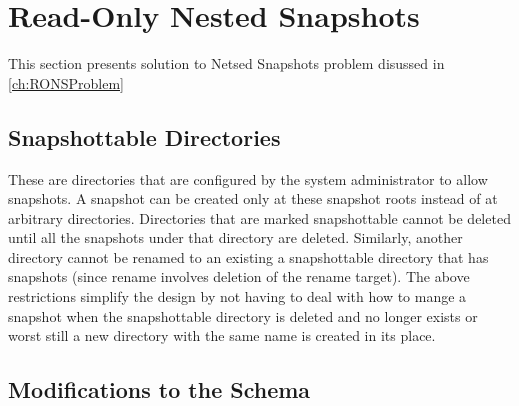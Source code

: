 \section{Read-Only Nested Snapshots}


This section presents solution to Netsed Snapshots problem disussed in \ref{ch:RONSProblem}
\subsection{Snapshottable Directories}

 These are directories that are configured
by the system administrator to allow snapshots. A snapshot can be created only at these snapshot roots
instead of at arbitrary directories.
Directories that are marked snapshottable cannot be deleted until all the snapshots under that directory
are deleted. Similarly, another directory cannot be renamed to an existing a snapshottable directory
that has snapshots (since rename involves deletion of the rename target). The above restrictions
simplify the design by not having to deal with how to mange a snapshot when the snapshottable
directory is deleted and no longer exists or worst still a new directory with the same name is created in
its place.

\subsection{Modifications to the Schema}
\label{RONSS:schema}

